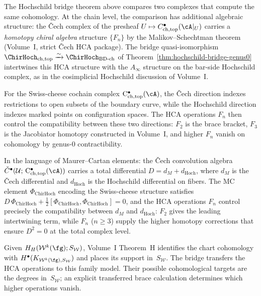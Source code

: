 \begin{remark}
\label{rem:hca-hochschild-descent}
The Hochschild bridge theorem above compares two complexes that
compute the same cohomology. At the chain level, the comparison
has additional algebraic structure: the \v{C}ech complex of the
presheaf $U \mapsto C^\bullet_{\mathrm{ch,top}}(\cA|_U)$ carries
a \emph{homotopy chiral algebra} structure $\{F_n\}$ by the
Malikov--Schechtman theorem~\cite{MS24} (Volume~I,
strict \v{C}ech HCA package). The bridge quasi-isomorphism
$\ChirHoch_{\mathrm{ch,top}} \xrightarrow{\sim}
\ChirHoch_{\mathrm{BD\text{-}ch}}$
of Theorem~\ref{thm:hochschild-bridge-genus0} intertwines
this HCA structure with the $A_\infty$ structure on the bar-side
Hochschild complex, as in the cosimplicial Hochschild discussion
of Volume~I.

For the Swiss-cheese cochain complex
$\mathrm{C}^\bullet_{\mathrm{ch,top}}(\cA)$, the \v{C}ech
direction indexes restrictions to open subsets of the boundary
curve, while the Hochschild direction indexes marked points
on configuration spaces. The HCA operations $F_n$ then control
the compatibility between these two directions: $F_2$ is the
brace bracket, $F_3$ is the Jacobiator homotopy constructed in
Volume~I,
and higher $F_n$ vanish on cohomology by
genus-$0$ contractibility.

In the language of Maurer--Cartan elements: the \v{C}ech
convolution algebra
$\check{C}^\bullet(\mathcal{U};\,
\mathrm{C}^\bullet_{\mathrm{ch,top}}(\cA))$ carries a
total differential $D = d_M + d_{\mathrm{Hoch}}$, where
$d_M$ is the \v{C}ech differential and
$d_{\mathrm{Hoch}}$ is the Hochschild differential
on fibers. The MC element $\Phi_{\mathrm{ChirHoch}}$
encoding the Swiss-cheese structure satisfies
$D\,\Phi_{\mathrm{ChirHoch}}
+ \tfrac{1}{2}[\Phi_{\mathrm{ChirHoch}},
\Phi_{\mathrm{ChirHoch}}] = 0$, and
the HCA operations $F_n$ control precisely
the compatibility between $d_M$ and $d_{\mathrm{Hoch}}$:
$F_2$ gives the leading intertwining term, while
$F_n$ ($n \geq 3$) supply the higher homotopy corrections
that ensure $D^2 = 0$ at the total complex level.

Given $H_H(\mathcal W^k(\fg);S_{\mathcal W})$, Volume~I Theorem~H
identifies the chart cohomology with
$H^\bullet(K_{\mathcal W^k(\fg),S_{\mathcal W}})$ and places its
support in~$S_{\mathcal W}$.  The bridge transfers the HCA operations
to this family model.  Their possible cohomological targets are the
degrees in~$S_{\mathcal W}$; an explicit transferred brace calculation
determines which higher operations vanish.
\end{remark}

